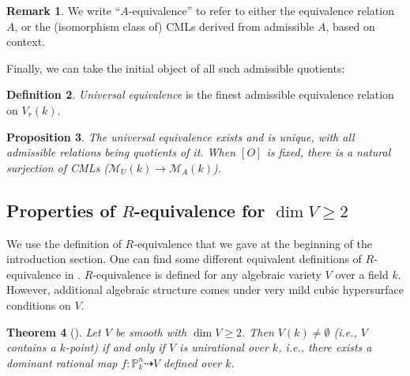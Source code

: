 \documentclass[11pt]{article}
\newtheorem{theorem}{Theorem}[section] %
\newtheorem{proposition}[theorem]{Proposition}
\newtheorem{corollary}[theorem]{Corollary}
\theoremstyle{definition}
\newtheorem{definition}[theorem]{Definition}
\newtheorem{remark}[theorem]{Remark}
\begin{document}
\begin{remark}
We write ``$A$-equivalence'' to refer to either the equivalence relation $A$, or the (isomorphism class of) CMLs derived from admissible $A$, based on context.
\end{remark}

Finally, we can take the initial object of all such admissible quotients:

\begin{definition}
\textit{Universal equivalence} is the finest admissible equivalence relation on $V_r(k)$.
\end{definition}
\begin{proposition}
The universal equivalence exists and is unique, with all admissible relations being quotients of it. When $[O]$ is fixed, there is a natural surjection of CMLs ($\mathcal{M}_U(k) \to \mathcal{M}_A(k)$).
\end{proposition}

\subsection{Properties of $R$-equivalence for $\dim V \ge 2$}

We use the definition of $R$-equivalence that we gave at the beginning of the introduction section.
One can find some different equivalent definitions of $R$-equivalence in \cite[14.1-2]{manin3}.
$R$-equivalence is defined for any algebraic variety $V$ over a field $k$. However, additional algebraic structure comes under very mild cubic hypersurface conditions on $V$.

\begin{theorem}[{\cite[Thm.~1]{kollar2002unirationality}}]
\label{thm:k-point}
Let $V$ be smooth with $\dim V \ge 2$. Then $V(k) \neq \emptyset$ (i.e., $V$ contains a $k$-point) if and only if $V$ is unirational over $k$, i.e., there exists a dominant rational map $f : \mathbb{P}^n_k \dashrightarrow V$ defined over $k$.
\end{theorem}

\end{document}
